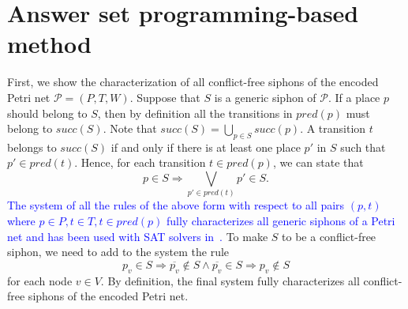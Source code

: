 \documentclass[runningheads]{llncs}
\newcommand{\revise}[1]{\textcolor{blue}{#1}}
\begin{document}
\section{Answer set programming-based method}
First, we show the characterization of all conflict-free siphons of the encoded Petri net \(\mathcal{P} = (P, T, W)\). Suppose that \(S\) is a generic siphon of \(\mathcal{P}\). If a place \(p\) should belong to \(S\), then by definition all the transitions in \(pred(p)\) must belong to \(succ(S)\). Note that \(succ(S) = \bigcup_{p \in S}succ(p)\). A transition \(t\) belongs to \(succ(S)\) if and only if there is at least one place \(p'\) in \(S\) such that \(p' \in pred(t)\). Hence, for each transition \(t \in pred(p)\), we can state that
\begin{equation}
\label{eq:siphon}
p \in S \Rightarrow \bigvee_{p' \in pred(t)}p' \in S.
\end{equation}
\revise{The system of all the rules of the above form with respect to all pairs \((p, t)\) where \(p \in P, t \in T, t \in pred(p)\) fully characterizes all generic siphons of a Petri net and has been used with SAT solvers in~\cite{oanea2010new,nabli2016enumerating}.}
To make \(S\) to be a conflict-free siphon, we need to add to the system the rule
\begin{equation}
\label{eq:conflict}
p_v \in S \Rightarrow \overline{p_v} \not \in S \wedge \overline{p_v} \in S \Rightarrow p_v \not \in S
\end{equation}for each node \(v \in V\).
By definition, the final system fully characterizes all conflict-free siphons of the encoded Petri net.
\end{document}
